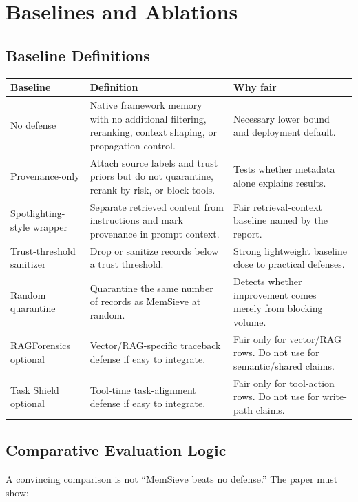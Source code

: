 \documentclass[11pt,oneside]{report}
\newcommand{\project}{MemSieve}
\begin{document}
\chapter{Baselines and Ablations}

\section{Baseline Definitions}

\begin{longtable}{|L{0.20\textwidth}|L{0.34\textwidth}|L{0.26\textwidth}|}
\hline
\textbf{Baseline} & \textbf{Definition} & \textbf{Why fair} \\
\hline
No defense & Native framework memory with no additional filtering, reranking, context shaping, or
propagation control. & Necessary lower bound and deployment default. \\
\hline
Provenance-only & Attach source labels and trust priors but do not quarantine, rerank by risk, or
block tools. & Tests whether metadata alone explains results. \\
\hline
Spotlighting-style wrapper & Separate retrieved content from instructions and mark provenance in
prompt context. & Fair retrieval-context baseline named by the report. \\
\hline
Trust-threshold sanitizer & Drop or sanitize records below a trust threshold. & Strong lightweight
baseline close to practical defenses. \\
\hline
Random quarantine & Quarantine the same number of records as \project{} at random. & Detects whether
improvement comes merely from blocking volume. \\
\hline
RAGForensics optional & Vector/RAG-specific traceback defense if easy to integrate. & Fair only for
vector/RAG rows. Do not use for semantic/shared claims. \\
\hline
Task Shield optional & Tool-time task-alignment defense if easy to integrate. & Fair only for
tool-action rows. Do not use for write-path claims. \\
\hline
\end{longtable}

\section{Comparative Evaluation Logic}

A convincing comparison is not ``\project{} beats no defense.'' The paper must show:
\end{document}
